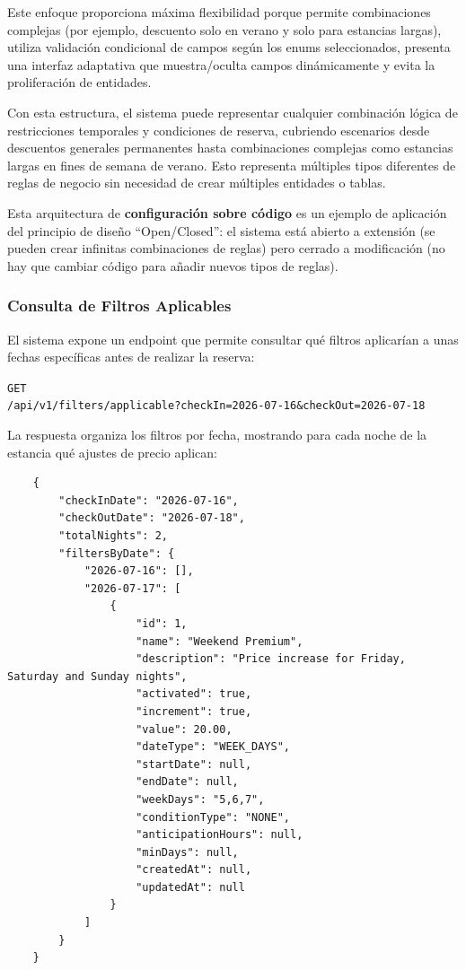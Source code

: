 Este enfoque proporciona máxima flexibilidad porque permite combinaciones complejas (por ejemplo, descuento solo en verano y solo para estancias largas), utiliza validación condicional de campos según los enums seleccionados, presenta una interfaz adaptativa que muestra/oculta campos dinámicamente y evita la proliferación de entidades.

Con esta estructura, el sistema puede representar cualquier combinación lógica de restricciones temporales y condiciones de reserva, cubriendo escenarios desde descuentos generales permanentes hasta combinaciones complejas como estancias largas en fines de semana de verano. Esto representa múltiples tipos diferentes de reglas de negocio sin necesidad de crear múltiples entidades o tablas.

Esta arquitectura de \textbf{configuración sobre código} es un ejemplo de aplicación del principio de diseño ``Open/Closed'': el sistema está abierto a extensión (se pueden crear infinitas combinaciones de reglas) pero cerrado a modificación (no hay que cambiar código para añadir nuevos tipos de reglas).

\subsubsection{Consulta de Filtros Aplicables}
El sistema expone un endpoint que permite consultar qué filtros aplicarían a unas fechas específicas antes de realizar la reserva:

\texttt{GET \\ /api/v1/filters/applicable?checkIn=2026-07-16\&checkOut=2026-07-18}

La respuesta organiza los filtros por fecha, mostrando para cada noche de la estancia qué ajustes de precio aplican:
 \begin{lstlisting}
    {
        "checkInDate": "2026-07-16",
        "checkOutDate": "2026-07-18",
        "totalNights": 2,
        "filtersByDate": {
            "2026-07-16": [],
            "2026-07-17": [
                {
                    "id": 1,
                    "name": "Weekend Premium",
                    "description": "Price increase for Friday, Saturday and Sunday nights",
                    "activated": true,
                    "increment": true,
                    "value": 20.00,
                    "dateType": "WEEK_DAYS",
                    "startDate": null,
                    "endDate": null,
                    "weekDays": "5,6,7",
                    "conditionType": "NONE",
                    "anticipationHours": null,
                    "minDays": null,
                    "createdAt": null,
                    "updatedAt": null
                }
            ]
        }
    }
 \end{lstlisting}
 
